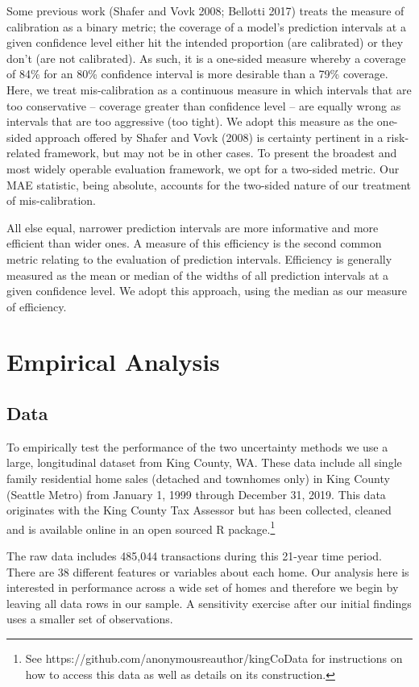 \documentclass[colTwo]{format}
\theoremstyle{definition}
\begin{document}
Some previous work (Shafer and Vovk 2008; Bellotti 2017) treats the measure of calibration as a binary metric; the coverage of a model’s prediction intervals at a given confidence level either hit the intended proportion (are calibrated) or they don’t (are not calibrated).  As such, it is a one-sided measure whereby a coverage of 84\% for an 80\% confidence interval is more desirable than a 79\% coverage.  Here, we treat mis-calibration as a continuous measure in which intervals that are too conservative -- coverage greater than confidence level -- are equally wrong as intervals that are too aggressive (too tight). We adopt this measure as the one-sided approach offered by Shafer and Vovk (2008) is certainty pertinent in a risk-related framework, but may not be in other cases.  To present the broadest and most widely operable evaluation framework, we opt for a two-sided metric.  Our MAE statistic, being absolute, accounts for the two-sided nature of our treatment of mis-calibration.  

All else equal, narrower prediction intervals are more informative and more efficient than wider ones.  A measure of this efficiency is the second common metric relating to the evaluation of prediction intervals.  Efficiency is generally measured as the mean or median of the widths of all prediction intervals at a given confidence level.  We adopt this approach, using the median as our measure of efficiency. 

\section{Empirical Analysis}

\subsection{Data}

To empirically test the performance of the two uncertainty methods we use a large, longitudinal dataset from King County, WA.  These data include all single family residential home sales (detached and townhomes only) in King County (Seattle Metro) from January 1, 1999 through December 31, 2019. This data originates with the King County Tax Assessor but has been collected, cleaned and is available online in an open sourced R package.\footnote{See https://github.com/anonymousreauthor/kingCoData for instructions on how to access this data as well as details on its construction.}

The raw data includes 485,044 transactions during this 21-year time period.  There are 38 different features or variables about each home. Our analysis here is interested in performance across a wide set of homes and therefore we begin by leaving all data rows in our sample.  A sensitivity exercise after our initial findings uses a smaller set of observations.
\end{document}
